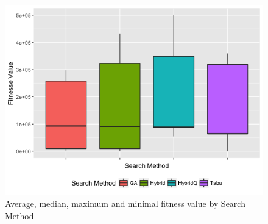 \documentclass{bmcart}
\begin{document}
\begin{backmatter}
\begin{figure}[h!]
\centering
\includegraphics{./images/experiment1-4.png}
\caption{Average, median, maximum and minimal fitness value by Search Method}
\label{fig:boxplot1}
\end{figure}


\end{backmatter}
\end{document}
